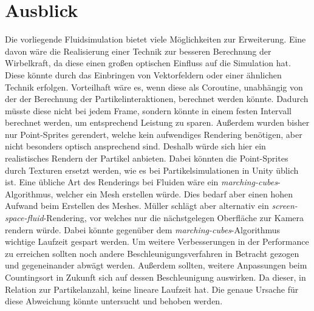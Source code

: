 \documentclass[intern,palatino]{cgBA}
\begin{document}
\section{Ausblick}\label{img:ausblick}

Die vorliegende Fluidsimulation bietet viele Möglichkeiten zur Erweiterung. Eine davon wäre die Realisierung einer Technik zur besseren Berechnung der Wirbelkraft, da diese einen großen optischen Einfluss auf die Simulation hat. Diese könnte durch das Einbringen von Vektorfeldern oder einer ähnlichen Technik erfolgen. Vorteilhaft wäre es, wenn diese als Coroutine, unabhängig von der der Berechnung der Partikelinteraktionen, berechnet werden könnte. Dadurch müsste diese nicht bei jedem Frame, sondern könnte in einem festen Intervall berechnet werden, um entsprechend Leistung zu sparen.
\newline
Außerdem wurden bisher nur Point-Sprites gerendert, welche kein aufwendiges Rendering benötigen, aber nicht besonders optisch ansprechend sind. Deshalb würde sich hier ein realistisches Rendern der Partikel anbieten. Dabei könnten die Point-Sprites durch Texturen ersetzt werden, wie es bei Partikelsimulationen in Unity üblich ist. Eine übliche Art des Renderings bei Fluiden wäre ein \textit{marching-cubes}-Algorithmus, welcher ein Mesh erstellen würde. Dies bedarf aber einen hohen Aufwand beim Erstellen des Meshes. Müller \cite{muller2007screen} schlägt aber alternativ ein \textit{screen-space-fluid}-Rendering, vor welches nur die nächstgelegen Oberfläche zur Kamera rendern würde. Dabei könnte gegenüber dem \textit{marching-cubes}-Algorithmus wichtige Laufzeit gespart werden.
\newline
Um weitere Verbesserungen in der Performance zu erreichen sollten noch andere Beschleunigungsverfahren in Betracht gezogen und gegeneinander abwägt werden. Außerdem sollten, weitere Anpassungen beim Countingsort in Zukunft sich auf dessen Beschleunigung auswirken. Da dieser, in Relation zur Partikelanzahl, keine lineare Laufzeit hat. Die genaue Ursache für diese Abweichung könnte untersucht und behoben werden.

\newpage
\listoffigures
\newpage

\end{document}
